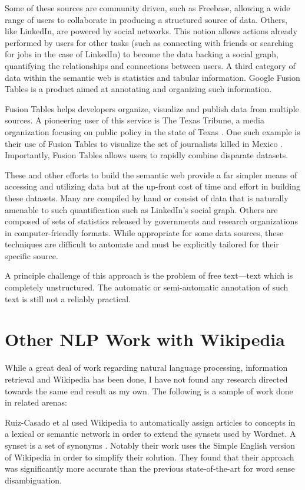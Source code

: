 Some of these sources are community driven, such as Freebase, allowing a wide range of users to collaborate in producing a structured source of data.  Others, like LinkedIn, are powered by social networks.  This notion allows actions already performed by users for other tasks (such as connecting with friends or searching for jobs in the case of LinkedIn) to become the data backing a social graph, quantifying the relationships and connections between users.  A third category of data within the semantic web is statistics and tabular information.  Google Fusion Tables is a product aimed at annotating and organizing such information.

Fusion Tables helps developers organize, visualize and publish data from multiple sources.  A pioneering user of this service is The Texas Tribune, a media organization focusing on public policy in the state of Texas \cite{textrib}.  One such example is their use of Fusion Tables to visualize the set of journalists killed in Mexico \cite{texjour} \cite{texjour1}.  Importantly, Fusion Tables allows users to rapidly combine disparate datasets.

These and other efforts to build the semantic web provide a far simpler means of accessing and utilizing data but at the up-front cost of time and effort in building these datasets.  Many are compiled by hand or consist of data that is naturally amenable to such quantification such as LinkedIn's social graph.  Others are composed of sets of statistics released by governments and research organizations in computer-friendly formats.  While appropriate for some data sources, these techniques are difficult to automate and must be explicitly tailored for their specific source.

A principle challenge of this approach is the problem of free text---text which is completely unstructured.  The automatic or semi-automatic annotation of such text is still not a reliably practical.

\section{Other NLP Work with Wikipedia}

While a great deal of work regarding natural language processing, information retrieval and Wikipedia has been done, I have not found any research directed towards the same end result as my own.  The following is a sample of work done in related arenas:

Ruiz-Casado et al \cite{Ruiz-casado05automaticassignment} used Wikipedia to automatically assign articles to concepts in a lexical or semantic network in order to extend the synsets used by Wordnet.  A synset is a set of synonyms \cite{nlpbook}.  Notably their work uses the Simple English version of Wikipedia in order to simplify their solution.  They found that their approach was significantly more accurate than the previous state-of-the-art for word sense disambiguation.

